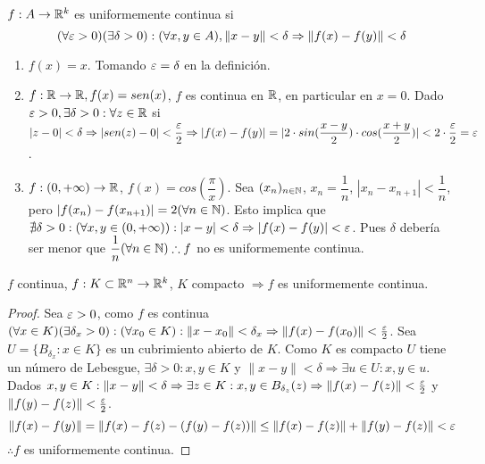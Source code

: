 \begin{definition}
  $f: A \to \mathbb{R}^k$ es uniformemente continua si \begin{equation}
    (\forall \varepsilon > 0)(\exists \delta > 0) : (\forall x,y \in A), \|x-y\| < \delta \Rightarrow \|f(x) - f(y)\| < \delta
  \end{equation}
\end{definition}

\begin{eg}
  \begin{enumerate}
    \item $f(x) = x$. Tomando $\varepsilon = \delta$ en la definición.
    \item $f: \mathbb{R} \to \mathbb{R}, f(x) = sen(x)$, $f$ es continua en $\mathbb{R}$, en particular en $x = 0$. Dado $\varepsilon > 0, \exists \delta > 0 : \forall z \in \mathbb{R}$ si $|z-0| < \delta \Rightarrow |sen(z) - 0| < \dfrac{\varepsilon}{2} \Rightarrow |f(x) - f(y)| = |2 \cdot sin(\dfrac{x-y}{2}) \cdot cos(\dfrac{x+y}{2})| < 2 \cdot \dfrac{\varepsilon}{2} = \varepsilon$.
    \item $f: (0, +\infty) \to \mathbb{R}$, $f(x) = cos(\dfrac{\pi}{x})$. Sea $(x_n)_{n \in \mathbb{N}}$, $x_n = \dfrac{1}{n}$, $|x_n - x_{n+1}| < \dfrac{1}{n}$, pero $|f(x_n) - f(x_{n+1})| = 2 (\forall n \in \mathbb{N})$. Esto implica que $\nexists \delta > 0 : (\forall x,y \in (0, +\infty)) : |x-y| < \delta \Rightarrow |f(x) - f(y)| < \varepsilon$. Pues $\delta$ debería ser menor que $\dfrac{1}{n} (\forall n \in \mathbb{N}) \therefore f$ no es uniformemente continua.
  \end{enumerate}
\end{eg}

\begin{theorem}
  $f$ continua, $f: K \subset \mathbb{R}^n \to \mathbb{R}^k$, $K$ compacto $\Rightarrow f$ es uniformemente continua.
  \begin{proof}
    Sea $\varepsilon > 0$, como $f$ es continua $(\forall x \in K)(\exists \delta_x > 0) : (\forall x_0 \in K) : \|x - x_0\| < \delta_x \Rightarrow \|f(x) - f(x_0)\| < \frac{\varepsilon}{2}$. Sea $U = \{B_{\delta_x} : x \in K\}$ es un cubrimiento abierto de $K$. Como $K$ es compacto $U$ tiene un número de Lebesgue, $\exists \delta > 0 : x, y \in K$ y $ \|x-y\| < \delta \Rightarrow \exists u \in U : x, y \in u$. Dados $x, y \in K : \|x-y\| < \delta \Rightarrow \exists z \in K : x, y \in B_{\delta_z}(z) \Rightarrow \|f(x) - f(z)\| < \frac{\varepsilon}{2}$ y $\|f(y) - f(z)\| < \frac{\varepsilon}{2}$.
    \begin{equation}
      \|f(x) - f(y)\| = \|f(x) - f(z) - (f(y) - f(z))\| \leq \|f(x) - f(z)\| + \|f(y) - f(z)\| < \varepsilon
    \end{equation} $\therefore f$ es uniformemente continua.
  \end{proof}
\end{theorem}


